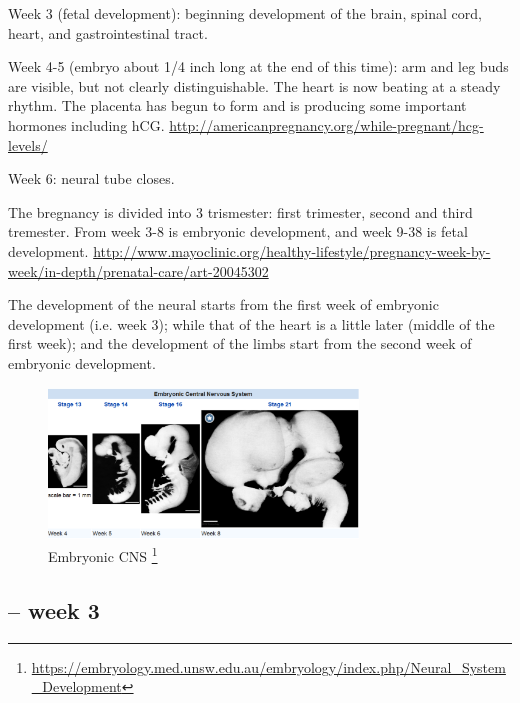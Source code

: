 \begin{mdframed}
\begin{itemize}
\end{itemize}

Week 3 (fetal development): beginning development of the brain, spinal cord,
heart, and gastrointestinal tract.

Week 4-5 (embryo about 1/4 inch long at the end of this time): arm and leg buds
are visible, but not clearly distinguishable. The heart is now beating at a
steady rhythm.
The placenta has begun to form and is producing some important hormones
including hCG. \url{http://americanpregnancy.org/while-pregnant/hcg-levels/}

Week 6: neural tube closes.

The bregnancy is divided into 3 trismester: first trimester, second and third tremester.
From week 3-8 is embryonic development, and week 9-38 is fetal development.
\url{http://www.mayoclinic.org/healthy-lifestyle/pregnancy-week-by-week/in-depth/prenatal-care/art-20045302}

The development of the neural starts from the first week of embryonic
development (i.e. week 3); while that of the heart is a little later (middle of
the first week); and the development of the limbs start from the second week of
embryonic development.
\end{mdframed}


\begin{figure}[hbt]
  \centerline{\includegraphics[height=4cm,
    angle=0]{./images/embryonic-CNS.eps}}
\caption{Embryonic CNS
\footnote{\url{https://embryology.med.unsw.edu.au/embryology/index.php/Neural_System_Development}}}
\label{fig:embryonic-CNS}
\end{figure}

\subsection{-- week 3}
\label{sec:endoderm}
\label{sec:mesoderm}
\label{sec:ectoderm}

